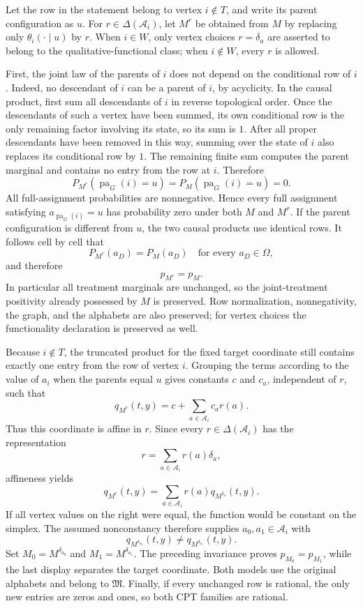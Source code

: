 Let the row in the statement belong to vertex \(i\notin T\), and write its parent configuration as \(u\).  For \(r\in\Delta(\mathcal A_i)\), let \(M^r\) be obtained from \(M\) by replacing only \(\theta_i(\cdot\mid u)\) by \(r\).  When \(i\in W\), only vertex choices \(r=\delta_a\) are asserted to belong to the qualitative-functional class; when \(i\notin W\), every \(r\) is allowed.

First, the joint law of the parents of \(i\) does not depend on the conditional row of \(i\).  Indeed, no descendant of \(i\) can be a parent of \(i\), by acyclicity.  In the causal product, first sum all descendants of \(i\) in reverse topological order.  Once the descendants of such a vertex have been summed, its own conditional row is the only remaining factor involving its state, so its sum is \(1\).  After all proper descendants have been removed in this way, summing over the state of \(i\) also replaces its conditional row by \(1\).  The remaining finite sum computes the parent marginal and contains no entry from the row at \(i\).  Therefore
\[
 P_{M^r}(\operatorname{pa}_G(i)=u)
 =P_M(\operatorname{pa}_G(i)=u)=0.
\]
All full-assignment probabilities are nonnegative.  Hence every full assignment satisfying \(a_{\operatorname{pa}_G(i)}=u\) has probability zero under both \(M\) and \(M^r\).  If the parent configuration is different from \(u\), the two causal products use identical rows.  It follows cell by cell that
\[
 P_{M^r}(a_D)=P_M(a_D)
 \quad\text{for every }a_D\in\Omega,
\]
and therefore
\[
 p_{M^r}=p_M.
\]
In particular all treatment marginals are unchanged, so the joint-treatment positivity already possessed by \(M\) is preserved.  Row normalization, nonnegativity, the graph, and the alphabets are also preserved; for vertex choices the functionality declaration is preserved as well.

Because \(i\notin T\), the truncated product for the fixed target coordinate still contains exactly one entry from the row of vertex \(i\).  Grouping the terms according to the value of \(a_i\) when the parents equal \(u\) gives constants \(c\) and \(c_a\), independent of \(r\), such that
\[
 q_{M^r}(t,y)=c+\sum_{a\in\mathcal A_i}c_a r(a).
\]
Thus this coordinate is affine in \(r\).  Since every
\(r\in\Delta(\mathcal A_i)\) has the representation
\[
 r=\sum_{a\in\mathcal A_i}r(a)\delta_a,
\]
affineness yields
\[
 q_{M^r}(t,y)
 =\sum_{a\in\mathcal A_i}r(a)
   q_{M^{\delta_a}}(t,y).
\]
If all vertex values on the right were equal, the function would be constant on the simplex.  The assumed nonconstancy therefore supplies \(a_0,a_1\in\mathcal A_i\) with
\[
 q_{M^{\delta_{a_0}}}(t,y)
 \ne q_{M^{\delta_{a_1}}}(t,y).
\]
Set \(M_0=M^{\delta_{a_0}}\) and \(M_1=M^{\delta_{a_1}}\).  The preceding invariance proves \(p_{M_0}=p_{M_1}\), while the last display separates the target coordinate.  Both models use the original alphabets and belong to \(\mathfrak M\).  Finally, if every unchanged row is rational, the only new entries are zeros and ones, so both CPT families are rational.